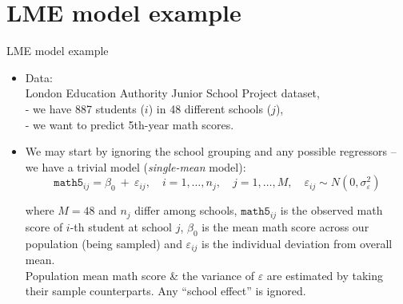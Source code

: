 \documentclass{beamer}
\begin{document}
\section{LME model example}
\begin{frame}{LME model example}
\begin{itemize}
\item Data: \\London Education Authority Junior School Project
dataset, \\- we have 887 students ($i$) in 48 different schools ($j$),\\- we want to predict 5th-year math scores.
\medskip
\item We may start by ignoring the school grouping and any possible regressors -- we have a trivial model (\textit{single-mean} model):
$$ \texttt{math5}_{ij} = \beta_0~+~\varepsilon_{ij}, \quad i=1,\dots,n_j,  \quad j=1,\dots, M,  \quad \varepsilon_{ij} \sim N(0,\sigma^2_{\varepsilon}) $$

where $M=48$ and $n_j$ differ among schools, $\texttt{math5}_{ij}$ is the observed  math score of $i$-th student at school $j$,
$\beta_0$ is the mean math score across our population (being sampled) and
$\varepsilon_{ij}$ is the individual deviation from overall mean.\\
\medskip
Population mean math score \& the variance of $\varepsilon$ are estimated by taking their sample counterparts. Any ``school effect'' is ignored.\\
\end{itemize}
\end{frame}
\end{document}
